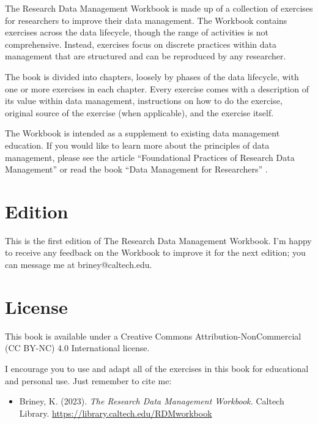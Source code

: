 \documentclass[
]{book}
\providecommand{\tightlist}{%
  \setlength{\itemsep}{0pt}\setlength{\parskip}{0pt}}
\begin{document}
The Research Data Management Workbook is made up of a collection of exercises for researchers to improve their data management. The Workbook contains exercises across the data lifecycle, though the range of activities is not comprehensive. Instead, exercises focus on discrete practices within data management that are structured and can be reproduced by any researcher.

The book is divided into chapters, loosely by phases of the data lifecycle, with one or more exercises in each chapter. Every exercise comes with a description of its value within data management, instructions on how to do the exercise, original source of the exercise (when applicable), and the exercise itself.

The Workbook is intended as a supplement to existing data management education. If you would like to learn more about the principles of data management, please see the article ``Foundational Practices of Research Data Management'' \citep{briney_foundational_2020} or read the book ``Data Management for Researchers'' \citep{briney_data_2015}.

\hypertarget{edition}{%
\section*{Edition}\label{edition}}

This is the first edition of The Research Data Management Workbook. I'm happy to receive any feedback on the Workbook to improve it for the next edition; you can message me at briney@caltech.edu.

\hypertarget{license}{%
\section*{License}\label{license}}

This book is available under a Creative Commons Attribution-NonCommercial (CC BY-NC) 4.0 International license.

I encourage you to use and adapt all of the exercises in this book for educational and personal use. Just remember to cite me:

\begin{itemize}
\tightlist
\item
  Briney, K. (2023). \emph{The Research Data Management Workbook.} Caltech Library. \url{https://library.caltech.edu/RDMworkbook}
\end{itemize}
\end{document}
